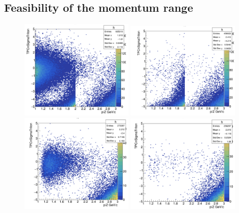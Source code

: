 \subsection{Feasibility of the momentum range}
\begin{figure}
    \centering
    \includegraphics[width=0.48\textwidth]{figures/triton/tbar_TPCnSigma_noTOF_noDCA.png}
    \includegraphics[width=0.48\textwidth]{figures/triton/tbar_TPCnSigma_noTOFcut.png}
    \includegraphics[width=0.48\textwidth]{figures/triton/tbar_TPCnSigma_TOF_cit_noDCA_cut.png}
    \includegraphics[width=0.48\textwidth]{figures/triton/tbar_TPCnSigma_TOF_cut_and_DCA_cut.png}

\end{figure}
